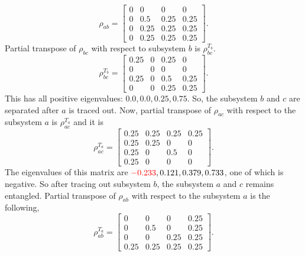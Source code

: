 \documentclass{scrartcl}
\begin{document}
	\begin{equation*}
		\rho_{ab} = \left[\begin{matrix}0 & 0 & 0 & 0\\0 & 0.5 & 0.25 & 0.25\\0 & 0.25 & 0.25 & 0.25\\0 & 0.25 & 0.25 & 0.25\end{matrix}\right].
	\end{equation*}
	Partial transpose of $\rho_{bc}$ with respect to subsystem $b $ is $\rho^{T_b}_{bc}$.
	\begin{equation*}
		\rho^{T_b}_{bc} = \left[\begin{matrix}0.25 & 0 & 0.25 & 0\\0 & 0 & 0 & 0\\0.25 & 0 & 0.5 & 0.25\\0 & 0 & 0.25 & 0.25\end{matrix}\right].
	\end{equation*}
	This has all positive eigenvalues: $0.0, 0.0, 0.25, 0.75$. So, the subsystem $b$ and $c$ are separated after $a$ is traced out. Now, partial transpose of $\rho_{ac}$ with respect to the subsystem $a$ is $\rho^{T_a}_{ac}$ and it is
	\begin{equation*}
		\rho^{T_a}_{ac} = \left[\begin{matrix}0.25 & 0.25 & 0.25 & 0.25\\0.25 & 0.25 & 0 & 0\\0.25 & 0 & 0.5 & 0\\0.25 & 0 & 0 & 0\end{matrix}\right].
	\end{equation*}
	The eigenvalues of this matrix are $\textcolor{red}{-0.233}, 0.121, 0.379, 0.733$, one of which is negative. So after tracing out subsystem $b$, the subsystem $a$ and $c$ remains entangled.
	Partial transpose of $\rho_{ab}$ with respect to the subsystem $a$ is the following,
	\begin{equation*}
		\rho^{T_a}_{ab} = \left[\begin{matrix}0 & 0 & 0 & 0.25\\0 & 0.5 & 0 & 0.25\\0 & 0 & 0.25 & 0.25\\0.25 & 0.25 & 0.25 & 0.25\end{matrix}\right].
	\end{equation*}
\end{document}
